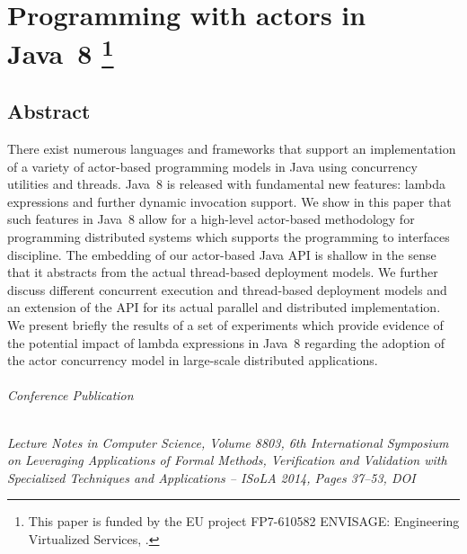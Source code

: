 
\chapter[Programming with actors in Java 8]{Programming with actors in Java~8%
\footnote{This paper is funded by the EU project FP7-610582 ENVISAGE: Engineering Virtualized Services, .}
}
% 
\label{ch:p02:ch01}
% 

\section*{Abstract}
There exist numerous languages and frameworks that support an implementation of a variety of actor-based programming models in Java using concurrency utilities and threads.
% 
Java~8 is released with fundamental new features: lambda expressions and further dynamic invocation support.
%
We show in this paper that such features in Java~8 allow for a high-level actor-based methodology for programming distributed systems which supports the programming to interfaces discipline.
%
The embedding of our actor-based Java API is shallow in the sense that it abstracts from the actual thread-based deployment models. 
%
We further discuss different concurrent execution and thread-based deployment models and an extension of the API for its actual parallel 
and distributed implementation.
% 
We present briefly the results of a set of experiments which provide evidence of  the potential impact of lambda expressions in Java~8  regarding the adoption of the actor concurrency model in large-scale distributed applications.

% 

\subparagraph*{Conference Publication}
\emph{Lecture Notes in Computer Science, Volume 8803, 6th International Symposium on Leveraging Applications of Formal Methods, Verification and Validation with Specialized Techniques and Applications -- ISoLA 2014, Pages 37--53, DOI 
}

% 


